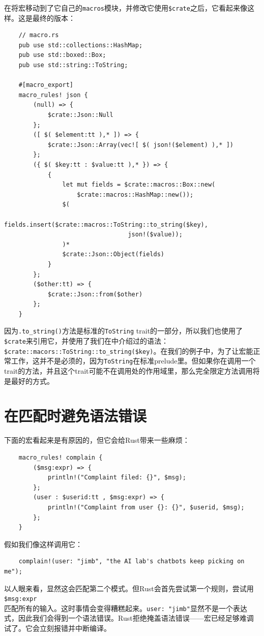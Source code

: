 在将宏移动到了它自己的\texttt{macros}模块，并修改它使用\texttt{\$crate}之后，它看起来像这样。这是最终的版本：
\begin{verbatim}
    // macro.rs
    pub use std::collections::HashMap;
    pub use std::boxed::Box;
    pub use std::string::ToString;

    #[macro_export]
    macro_rules! json {
        (null) => {
            $crate::Json::Null
        };
        ([ $( $element:tt ),* ]) => {
            $crate::Json::Array(vec![ $( json!($element) ),* ])
        };
        ({ $( $key:tt : $value:tt ),* }) => {
            {
                let mut fields = $crate::macros::Box::new(
                    $crate::macros::HashMap::new());
                $(
                    fields.insert($crate::macros::ToString::to_string($key), 
                                  json!($value));
                )*
                $crate::Json::Object(fields)
            }
        };
        ($other:tt) => {
            $crate::Json::from($other)
        };
    }
\end{verbatim}

因为\texttt{.to\_string()}方法是标准的\texttt{ToString} trait的一部分，所以我们也使用了\texttt{\$crate}来引用它，并使用了我们在中介绍过的语法：\\
\texttt{\$crate::macors::ToString::to\_string(\$key)}。在我们的例子中，为了让宏能正常工作，这并不是必须的，因为\texttt{ToString}在标准prelude里。但如果你在调用一个trait的方法，并且这个trait可能不在调用处的作用域里，那么完全限定方法调用将是最好的方式。

\section{在匹配时避免语法错误}
下面的宏看起来是有原因的，但它会给Rust带来一些麻烦：
\begin{verbatim}
    macro_rules! complain {
        ($msg:expr) => {
            println!("Complaint filed: {}", $msg);
        };
        (user : $userid:tt , $msg:expr) => {
            println!("Complaint from user {}: {}", $userid, $msg);
        };
    }
\end{verbatim}

假如我们像这样调用它：
\begin{verbatim}
    complain!(user: "jimb", "the AI lab's chatbots keep picking on me");
\end{verbatim}

以人眼来看，显然这会匹配第二个模式。但Rust会首先尝试第一个规则，尝试用\texttt{\$msg:expr}\\
匹配所有的输入。这时事情会变得糟糕起来。\texttt{user: "jimb"}显然不是一个表达式，因此我们会得到一个语法错误。Rust拒绝掩盖语法错误——宏已经足够难调试了。它会立刻报错并中断编译。

